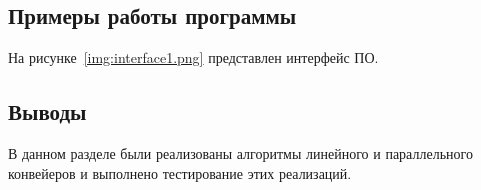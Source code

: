 \subsection{Примеры работы программы}
На рисунке~\ref{img:interface1.png} представлен интерфейс ПО. 



\subsection*{Выводы}
В данном разделе были реализованы алгоритмы линейного и параллельного конвейеров и выполнено тестирование этих реализаций.



\newpage
	
